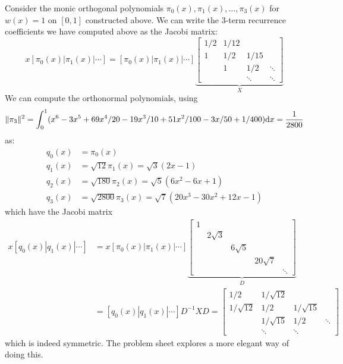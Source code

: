 \begin{example} Consider the monic orthogonal polynomials $\ensuremath{\pi}_0(x),\ensuremath{\pi}_1(x),\ensuremath{\ldots},\ensuremath{\pi}_3(x)$ for $w(x) = 1$ on $[0,1]$ constructed above. We can write the 3-term recurrence coefficients we have computed above as the Jacobi matrix:
\[
x [\ensuremath{\pi}_0(x)| \ensuremath{\pi}_1(x)| \ensuremath{\cdots}] = [\ensuremath{\pi}_0(x)| \ensuremath{\pi}_1(x)| \ensuremath{\cdots}] \underbrace{\begin{bmatrix} 1/2 & 1/12 \\
                                                            1 & 1/2 & 1/15 \\
                                                            & 1 & 1/2 & \ensuremath{\ddots} \\
                                                            & & \ensuremath{\ddots} & \ensuremath{\ddots} \end{bmatrix}}_X
\]
We can compute the orthonormal polynomials, using
\[
\|\ensuremath{\pi}_3\|^2 = \int_0^1 (x^6 - 3x^5 + 69x^4/20 -19x^3/10 + 51x^2/100 - 3x/50 + 1/400) {\rm d}x = {1 \over 2800}
\]
as:
\begin{align*}
q_0(x) &= \ensuremath{\pi}_0(x) \\
q_1(x) &= \sqrt{12} \ensuremath{\pi}_1(x)= \sqrt{3} (2  x - 1) \\
q_2(x) &= \sqrt{180} \ensuremath{\pi}_2(x) = \sqrt{5} (6x^2 - 6x + 1) \\
q_3(x) &= \sqrt{2800} \ensuremath{\pi}_3(x) = \sqrt{7} (20x^3-30x^2 + 12x - 1)
\end{align*}
which have the Jacobi matrix
\begin{align*}
x [q_0(x)| q_1(x)| \ensuremath{\cdots}] &= x [\ensuremath{\pi}_0(x)| \ensuremath{\pi}_1(x)| \ensuremath{\cdots}] \underbrace{\begin{bmatrix} 1 \\ & 2\sqrt{3} \\ && 6 \sqrt{5} \\ &&& 20 \sqrt{7} \\
&&&& \ensuremath{\ddots}
\end{bmatrix}}_D \\
&= [q_0(x)| q_1(x)| \ensuremath{\cdots}] D^{-1} X D =
     \begin{bmatrix} 1/2 & 1/\sqrt{12} \\
                    1/\sqrt{12} & 1/2 &  1/\sqrt{15} \\
                    & 1/\sqrt{15} & 1/2 & \ensuremath{\ddots} \\
                    & \ensuremath{\ddots} & \ensuremath{\ddots} \end{bmatrix}
\end{align*}
which is indeed symmetric. The problem sheet explores a more elegant way of doing this. \end{example}

